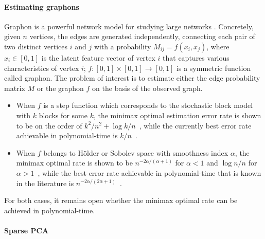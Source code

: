\paragraph{Estimating graphons}
Graphon is a powerful network model for studying large networks \cite{Lovasz12}.
Concretely, given 
$n$ vertices, the edges are generated
independently, connecting each pair of two distinct
vertices $i$ and $j$ with a probability $ M_{ij} = f (x_i, x_j)$,
where $x_i \in [0,1]$ is the latent feature vector of vertex $i$ that
captures various characteristics of vertex $i$; $f: [0,1] \times [0,1] 
\to [0,1]$ is a symmetric function called graphon. 
The problem of interest is 
to estimate  either the edge probability matrix $M$ or the graphon $f$ on the basis of the observed graph. 
\begin{itemize}
	\item When $f$ is a step function which corresponds to the stochastic block model
with $k$ blocks for some $k$, the minimax optimal estimation error rate is 
shown to be on the order of $k^2/n^2 + \log k/n$~\cite{gao2015rate}, while
the currently best error rate achievable in polynomial-time is $k/n$~\cite{klopp2017optimal}.
\item When $f$ belongs to H\"{o}lder or Sobolev space with smoothness
 index $\alpha$, the minimax optimal rate is shown to be $n^{-2\alpha/(\alpha+1)}$ for $\alpha<1$ 
 and $\log n/n$ for $\alpha>1$~\cite{gao2015rate},
while 
 the best error rate achievable in polynomial-time that is known in the literature is
 $n^{-2\alpha/(2\alpha+1)}$~\cite{Xugraphon17}. 
\end{itemize}
For both cases, it remains open whether the minimax optimal rate can be achieved in polynomial-time. 


\paragraph{Sparse PCA} 

